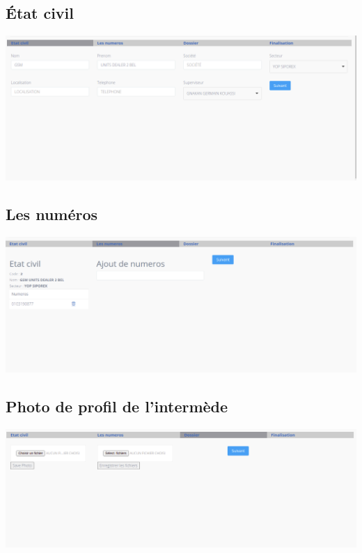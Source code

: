 		\subsection*{État civil}
		\begin{center}
			\includegraphics[scale=0.4]{chap_3/ajouter-intermed-etat-civil.png}
			\label{ajouter_intermede-etat-civil}
		\end{center}
		\subsection*{Les numéros}
			\begin{center}
				\includegraphics[scale=0.4]{chap_3/ajout-intermed-numeros.png}
				\label{ajouter_intermede-les-numeros}
			\end{center}
		
		\subsection*{Photo de profil de l'intermède}
		\begin{center}
			\includegraphics[scale=0.4]{chap_3/ajout-intermed-dossier.png}
			\label{ajouter_intermede-dossier}
		\end{center}
			
